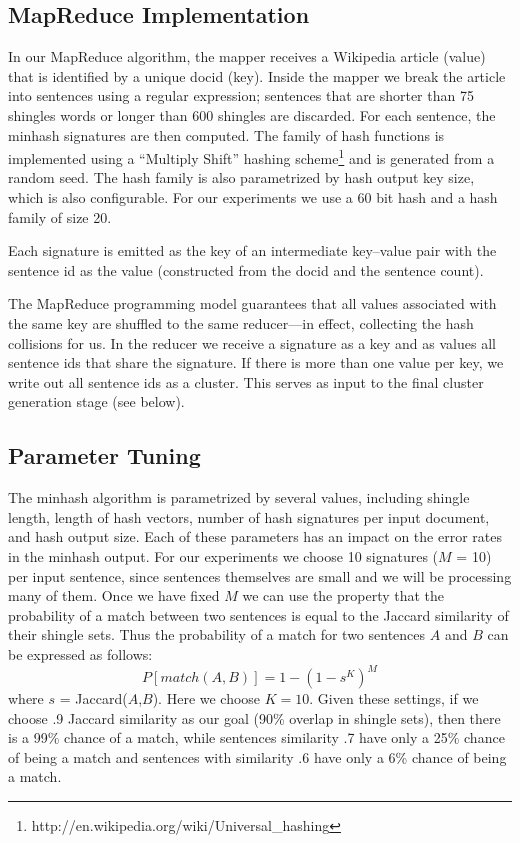 \documentclass[letterpaper]{article}
\begin{document}
\subsection{MapReduce Implementation}

In our MapReduce algorithm, the mapper receives a Wikipedia article
(value) that is identified by a unique docid (key). Inside the mapper
we break the article into sentences using a regular expression;
sentences that are shorter than 75 shingles words or longer than 600
shingles are discarded. For each sentence, the minhash signatures are
then computed. The family of hash functions is implemented using a
``Multiply Shift'' hashing scheme\footnote{\small
  http://en.wikipedia.org/wiki/Universal\_hashing} and is generated
from a random seed. The hash family is also parametrized by hash
output key size, which is also configurable. For our experiments we
use a 60 bit hash and a hash family of size 20.

Each signature is emitted as the key of an intermediate key--value
pair with the sentence id as the value (constructed from the docid and
the sentence count).

The MapReduce programming model guarantees that all values associated
with the same key are shuffled to the same reducer---in effect,
collecting the hash collisions for us. In the reducer we receive a
signature as a key and as values all sentence ids that share the
signature. If there is more than one value per key, we write out all
sentence ids as a cluster. This serves as input to the final cluster
generation stage (see below).

\subsection{Parameter Tuning}

The minhash algorithm is parametrized by several values, including
shingle length, length of hash vectors, number of hash signatures per
input document, and hash output size. Each of these parameters has an
impact on the error rates in the minhash output. For our experiments
we choose 10 signatures ($M$ = 10) per input sentence, since sentences
themselves are small and we will be processing many of them. Once we
have fixed $M$ we can use the property that the probability of a match
between two sentences is equal to the Jaccard similarity of their
shingle sets. Thus the probability of a match for two sentences $A$
and $B$ can be expressed as follows:
\[P[match(A,B)] = 1 - (1 - s^K)^M\]
where $s$ = Jaccard($A$,$B$). Here we choose $K = 10$. Given these
settings, if we choose .9 Jaccard similarity as our goal (90\% overlap
in shingle sets), then there is a 99\% chance of a match, while
sentences similarity .7 have only a 25\% chance of being a match and
sentences with similarity .6 have only a 6\% chance of being a match.
\end{document}
